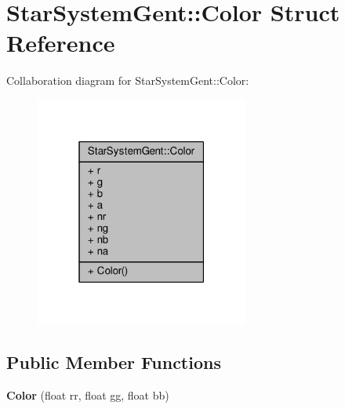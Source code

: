 \hypertarget{structStarSystemGent_1_1Color}{}\section{Star\+System\+Gent\+:\+:Color Struct Reference}
\label{structStarSystemGent_1_1Color}


Collaboration diagram for Star\+System\+Gent\+:\+:Color\+:
\nopagebreak
\begin{figure}[H]
\begin{center}
\leavevmode
\includegraphics[width=199pt]{df/d00/structStarSystemGent_1_1Color__coll__graph}
\end{center}
\end{figure}
\subsection*{Public Member Functions}
\begin{DoxyCompactItemize}
\item 
{\bfseries Color} (float rr, float gg, float bb)\hypertarget{structStarSystemGent_1_1Color_a227a51c87de0373a5769a01a559fb162}{}\label{structStarSystemGent_1_1Color_a227a51c87de0373a5769a01a559fb162}

\end{DoxyCompactItemize}
